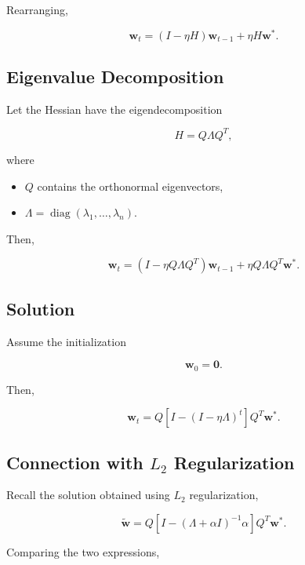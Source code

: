 \documentclass[11pt]{article}
\begin{document}
Rearranging,

\[
\boxed{
	\mathbf{w}_{t}
	=
	(I-\eta H)\mathbf{w}_{t-1}
	+
	\eta H\mathbf{w}^{*}.
}
\]


\subsection{Eigenvalue Decomposition}

Let the Hessian have the eigendecomposition

\[
H
=
Q\Lambda Q^{T},
\]

where

\begin{itemize}
	\item $Q$ contains the orthonormal eigenvectors,
	\item $\Lambda=\operatorname{diag}(\lambda_1,\ldots,\lambda_n)$.
\end{itemize}

Then,

\[
\boxed{
	\mathbf{w}_{t}
	=
	(I-\eta Q\Lambda Q^{T})
	\mathbf{w}_{t-1}
	+
	\eta Q\Lambda Q^{T}\mathbf{w}^{*}.
}
\]


\subsection{Solution}

Assume the initialization

\[
\mathbf{w}_0=\mathbf{0}.
\]

Then,

\[
\boxed{
	\mathbf{w}_{t}
	=
	Q
	\left[
	I-(I-\eta\Lambda)^t
	\right]
	Q^{T}
	\mathbf{w}^{*}.
}
\]


\subsection{Connection with $L_2$ Regularization}

Recall the solution obtained using $L_2$ regularization,

\[
\boxed{
	\tilde{\mathbf{w}}
	=
	Q
	\left[
	I-(\Lambda+\alpha I)^{-1}\alpha
	\right]
	Q^{T}
	\mathbf{w}^{*}.
}
\]

Comparing the two expressions,
\end{document}

